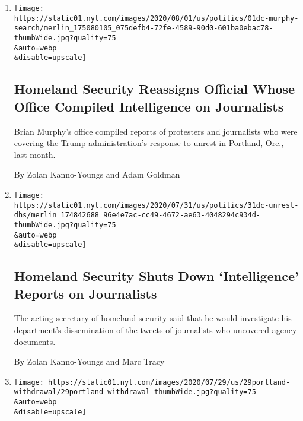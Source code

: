 \begin{enumerate}
\def\labelenumi{\arabic{enumi}.}
\item
  \href{/2020/08/01/us/politics/brian-murphy-homeland-security-protesters.html}{}

  \texttt{[image: https://static01.nyt.com/images/2020/08/01/us/politics/01dc-murphy-search/merlin\_175080105\_075defb4-72fe-4589-90d0-601ba0ebac78-thumbWide.jpg?quality=75\\\&auto=webp\\\&disable=upscale]}

  \hypertarget{homeland-security-reassigns-official-whose-office-compiled-intelligence-on-journalists}{%
  \subsection{Homeland Security Reassigns Official Whose Office Compiled
  Intelligence on
  Journalists}\label{homeland-security-reassigns-official-whose-office-compiled-intelligence-on-journalists}}

  Brian Murphy's office compiled reports of protesters and journalists
  who were covering the Trump administration's response to unrest in
  Portland, Ore., last month.

  By Zolan Kanno-Youngs and Adam Goldman
\item
  \href{/2020/07/31/us/politics/homeland-security-portland.html}{}

  \texttt{[image: https://static01.nyt.com/images/2020/07/31/us/politics/31dc-unrest-dhs/merlin\_174842688\_96e4e7ac-cc49-4672-ae63-4048294c934d-thumbWide.jpg?quality=75\\\&auto=webp\\\&disable=upscale]}

  \hypertarget{homeland-security-shuts-down-intelligence-reports-on-journalists}{%
  \subsection{Homeland Security Shuts Down `Intelligence' Reports on
  Journalists}\label{homeland-security-shuts-down-intelligence-reports-on-journalists}}

  The acting secretary of homeland security said that he would
  investigate his department's dissemination of the tweets of
  journalists who uncovered agency documents.

  By Zolan Kanno-Youngs and Marc Tracy
\item
  \href{/2020/07/29/us/protests-portland-federal-withdrawal.html}{}

  \texttt{[image: https://static01.nyt.com/images/2020/07/29/us/29portland-withdrawal/29portland-withdrawal-thumbWide.jpg?quality=75\\\&auto=webp\\\&disable=upscale]}


\end{enumerate}
